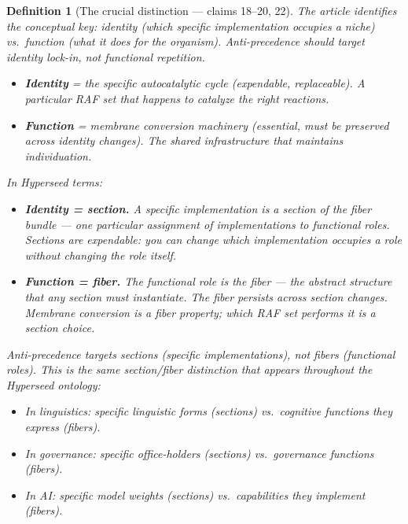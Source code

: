\documentclass[11pt,a4paper]{article}
\newtheorem{definition}{Definition}[section]
\begin{document}
\begin{definition}[The crucial distinction --- claims 18--20, 22]
\label{def:identity}
The article identifies the conceptual key: \emph{identity} (which
specific implementation occupies a niche) vs.\ \emph{function} (what
it does for the organism). Anti-precedence should target identity
lock-in, not functional repetition.

\begin{itemize}
\item \textbf{Identity} = the specific autocatalytic cycle (expendable,
  replaceable). A particular RAF set that happens to catalyze the right
  reactions.
\item \textbf{Function} = membrane conversion machinery (essential,
  must be preserved across identity changes). The shared infrastructure
  that maintains individuation.
\end{itemize}

In Hyperseed terms:
\begin{itemize}
\item \textbf{Identity = section.} A specific implementation is a
  section of the fiber bundle --- one particular assignment of
  implementations to functional roles. Sections are expendable:
  you can change which implementation occupies a role without
  changing the role itself.
\item \textbf{Function = fiber.} The functional role is the fiber ---
  the abstract structure that any section must instantiate. The fiber
  persists across section changes. Membrane conversion is a fiber
  property; which RAF set performs it is a section choice.
\end{itemize}

Anti-precedence targets sections (specific implementations), not fibers
(functional roles). This is the same section/fiber distinction that
appears throughout the Hyperseed ontology:
\begin{itemize}
\item In linguistics: specific linguistic forms (sections) vs.\
  cognitive functions they express (fibers).
\item In governance: specific office-holders (sections) vs.\
  governance functions (fibers).
\item In AI: specific model weights (sections) vs.\ capabilities
  they implement (fibers).
\end{itemize}
\end{definition}

\end{document}
